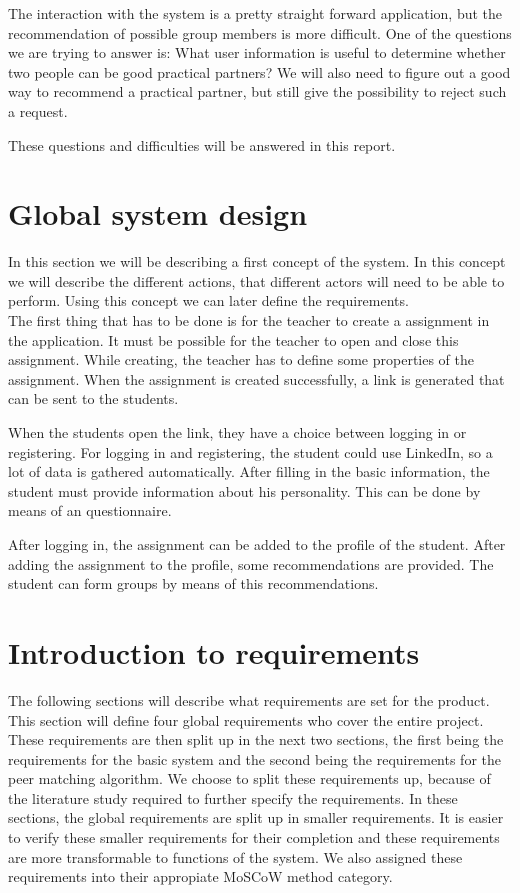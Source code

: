 \documentclass[]{article}
\begin{document}
The interaction with the system is a pretty straight forward application, but the recommendation of possible group members is more difficult.
One of the questions we are trying to answer is: What user information is useful to determine whether two people can be good practical partners?
We will also need to figure out a good way to recommend a practical partner, but still give the possibility to reject such a request.

These questions and difficulties will be answered in this report.

\section{Global system design}
In this section we will be describing a first concept of the system.
In this concept we will describe the different actions, that different actors will need to be able to perform.
Using this concept we can later define the requirements.\\

The first thing that has to be done is for the teacher to create a assignment in the application.
It must be possible for the teacher to open and close this assignment. 
While creating, the teacher has to define some properties of the assignment.
When the assignment is created successfully, a link is generated that can be sent to the students.

When the students open the link, they have a choice between logging in or registering.
For logging in and registering, the student could use LinkedIn, so a lot of data is gathered automatically.
After filling in the basic information, the student must provide information about his personality.
This can be done by means of an questionnaire.

After logging in, the assignment can be added to the profile of the student.
After adding the assignment to the profile, some recommendations are provided.
The student can form groups by means of this recommendations.

\section{Introduction to requirements}
The following sections will describe what requirements are set for the product.
This section will define four global requirements who cover the entire project.
These requirements are then split up in the next two sections, the first being the requirements for the basic system and the second being the requirements for the peer matching algorithm.
We choose to split these requirements up, because of the literature study required to further specify the requirements.
In these sections, the global requirements are split up in smaller requirements.
It is easier to verify these smaller requirements for their completion and these requirements are more transformable to functions of the system.
We also assigned these requirements into their appropiate MoSCoW \cite{highsmith2001agile} method category.
\end{document}
